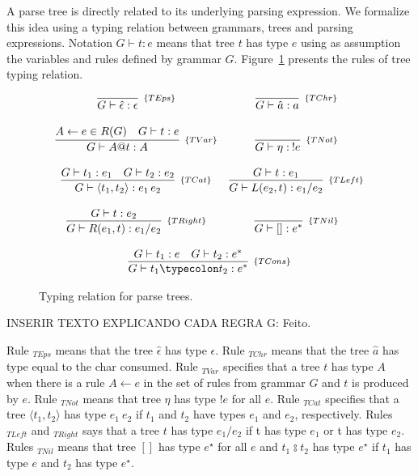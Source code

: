 A parse tree is directly related to its underlying parsing expression.
We formalize this idea using a typing relation between grammars, trees and
parsing expressions. Notation $G\vdash t : e$ means that tree $t$ has
type $e$ using as assumption the variables and rules defined by grammar $G$.
Figure~\ref{fig:tree-typing} presents the rules of tree typing relation.

\begin{figure}[H]
  \[
    \begin{array}{cc}
      \infer[_{\{TEps\}}]{G \vdash \hat{\epsilon} : \epsilon}{} &
      \infer[_{\{TChr\}}]{G\vdash \hat{a} : a}{} \\ \\
      \infer[_{\{TVar\}}]{ G \vdash A@t : A}
                      {A \leftarrow e \in R(G) & G\vdash t : e} &
      \infer[_{\{TNot\}}]{G\vdash \eta :\: ! e}{}\\ \\
      \infer[_{\{TCat\}}]{G\vdash \langle t_1, t_2\rangle : e_1\,e_2}
                      {G\vdash  t_1 : e_1 & G\vdash t_2 : e_2} &
      \infer[_{\{TLeft\}}]{G\vdash L(e_2,t) : e_1 / e_2}
                       {G\vdash t : e_1} \\ \\
      \infer[_{\{TRight\}}]{G\vdash R(e_1,t) : e_1 / e_2}
                       {G\vdash t : e_2} &
      \infer[_{\{TNil\}}]{G \vdash [] : e^*}{}\\ \\
      \multicolumn{2}{c}{
        \infer[_{\{TCons\}}]{G \vdash t_1  \typecolon  t_2 : e^*}
                         {G\vdash t_1 : e &
                          G \vdash t_2 : e^*}
      }
    \end{array}
  \]
  \centering
  \caption{Typing relation for parse trees.}
  \label{fig:tree-typing}
\end{figure}

INSERIR TEXTO EXPLICANDO CADA REGRA
G: Feito.

Rule \(_{TEps}\) means that the tree \(\hat{\epsilon}\) has type \(\epsilon\).
Rule \(_{TChr}\) means that the tree \(\hat{a}\) has type equal to the char consumed.
Rule \(_{TVar}\) specifies that a tree \(t\) has type \(A\) when there is a rule 
\(A \leftarrow e\) in the set of rules from grammar \(G\) and \(t\) is produced
by \(e\). Rule \(_{TNot}\) means that tree \(\eta\) has type \(!e\) for all \(e\). 
Rule \(_{TCat}\) specifies that a tree \(\langle t_1, t_2\rangle\) has type 
\(e_1\:e_2\) if \(t_1\) and \(t_2\) have types \(e_1\) and \(e_2\), respectively. 
Rules \(_{TLeft}\) and \(_{TRight}\) says that a tree \(t\) has type \(e_1 / e_2\) 
if t has type \(e_1\) or t has type \(e_2\). Rules \(_{TNil}\) means that tree 
\([]\) has type \(e^\star\) for all \(e\) and \(t_1  \typecolon  t_2\) has type \(e^\star\) 
if \(t_1\) has type \(e\) and \(t_2\) has type \(e^\star\).
 
